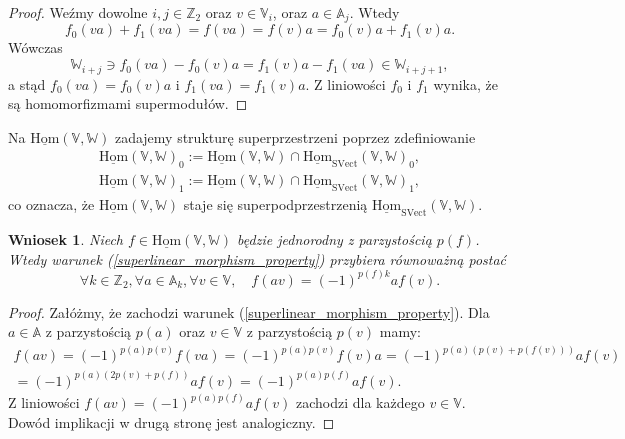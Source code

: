 \documentclass[11pt,a4paper]{report}
\newtheorem{corollary}[theorem]{Wniosek}
\theoremstyle{definition}
\begin{document}
\begin{proof}
Weźmy dowolne $i,j \in \mathbb{Z}_2$ oraz $v \in \mathbb{V}_i$, oraz $a \in \mathbb{A}_j$. Wtedy
\begin{equation*}
  f_0 (va) + f_1 (va) = f(va) = f(v)a = f_0(v)a + f_1(v)a.
\end{equation*}
Wówczas
\begin{equation*}
  \mathbb{W}_{i+j} \ni f_0 (va) - f_0(v)a = f_1(v)a - f_1 (va) \in \mathbb{W}_{i+j+1},
\end{equation*}
a stąd $f_0 (va)=f_0(v)a$ i $f_1 (va)=f_1(v)a$. Z liniowości $f_0$ i $f_1$ wynika, że są homomorfizmami supermodułów. 
\end{proof}
Na $\underline{\mathrm{Hom}}(\mathbb{V},\mathbb{W})$ zadajemy strukturę superprzestrzeni poprzez zdefiniowanie
\begin{equation*}
\begin{gathered}
  \underline{\mathrm{Hom}}(\mathbb{V},\mathbb{W})_0 := \underline{\mathrm{Hom}}(\mathbb{V},\mathbb{W}) \cap \underline{\mathrm{Hom}}_{\mathrm{SVect}}(\mathbb{V},\mathbb{W})_0, \\
  \underline{\mathrm{Hom}}(\mathbb{V},\mathbb{W})_1 := \underline{\mathrm{Hom}}(\mathbb{V},\mathbb{W}) \cap \underline{\mathrm{Hom}}_{\mathrm{SVect}}(\mathbb{V},\mathbb{W})_1,
\end{gathered}
\end{equation*}
co oznacza, że $\underline{\mathrm{Hom}}(\mathbb{V},\mathbb{W})$ staje się superpodprzestrzenią $\underline{\mathrm{Hom}}_{\mathrm{SVect}}(\mathbb{V},\mathbb{W})$. 

\begin{corollary}
 Niech $f \in \underline{\mathrm{Hom}}(\mathbb{V},\mathbb{W})$ będzie jednorodny z parzystością $p(f)$. Wtedy warunek (\ref{superlinear_morphism_property}) przybiera równoważną postać
\begin{equation}
\forall k \in \mathbb{Z}_2, \forall a \in \mathbb{A}_k, \forall v \in \mathbb{V}, \quad f(av) = (-1)^{p(f)k} af(v).
\end{equation}
\end{corollary}
\begin{proof}
Załóżmy, że zachodzi warunek (\ref{superlinear_morphism_property}). Dla $a \in \mathbb{A}$ z parzystością $p(a)$ oraz $v \in \mathbb{V}$ z parzystością $p(v)$ mamy:
\begin{equation*}
  \begin{gathered}
    f(av) = (-1)^{p(a)p(v)}f(va) = (-1)^{p(a)p(v)}f(v)a = (-1)^{p(a)(p(v) + p(f(v)))}af(v) \\ 
    = (-1)^{p(a)(2p(v) + p(f))}af(v) = (-1)^{p(a)p(f)} af(v).
  \end{gathered}
\end{equation*}
Z liniowości $f(av) = (-1)^{p(a)p(f)} af(v)$ zachodzi dla każdego $v \in \mathbb{V}$. Dowód implikacji w drugą stronę jest analogiczny.
\end{proof}
\end{document}
